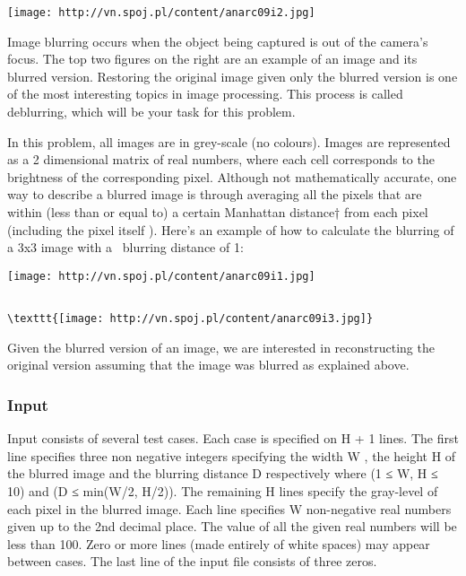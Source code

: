 




\texttt{[image: http://vn.spoj.pl/content/anarc09i2.jpg]}

   Image blurring occurs when the object being captured is out of the camera’s focus. The top two figures on the right are an example of an image and its blurred version. Restoring the original image given only the blurred version is one of the most interesting topics in image processing. This process is called deblurring, which will be your task for this problem.  




   In this problem, all images are in grey-scale (no colours). Images are represented as a 2 dimensional matrix of real numbers, where each cell corresponds to the  brightness of the corresponding pixel. Although not mathematically accurate, one way to describe a blurred image is through averaging all the pixels that are within (less than or equal to) a certain Manhattan distance† from each pixel (including the pixel itself ). Here’s an example of how to calculate the blurring of a 3x3 image with a  blurring distance of 1:  


\texttt{[image: http://vn.spoj.pl/content/anarc09i1.jpg]}
\begin{verbatim}

\texttt{[image: http://vn.spoj.pl/content/anarc09i3.jpg]}\end{verbatim}

   Given the blurred version of an image, we are interested in reconstructing the original version assuming that the image was blurred as explained above.  

\subsubsection{   Input  }

   Input consists of several test cases. Each case is specified on H + 1 lines. The first line specifies three non negative integers specifying the width W , the height H of the blurred image and the blurring distance D respectively where (1 ≤ W, H ≤ 10) and (D ≤ min(W/2, H/2)). The remaining H lines specify the gray-level of each pixel in the blurred image. Each line specifies W non-negative real numbers given up to the 2nd decimal place. The value of all the given real numbers will be less than 100. Zero or more lines (made entirely of white spaces) may appear between cases. The last line of the input file consists of three zeros.  

